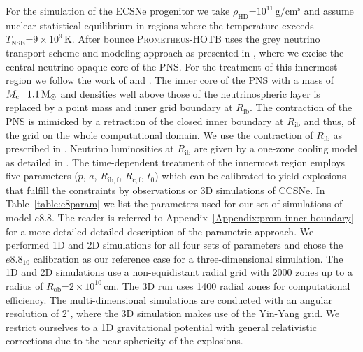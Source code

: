 \documentclass[fleqn,usenatbib]{mnras}
\newcommand{\solm}{\ensuremath{\rm{M_{\odot}}}\xspace}
\newcommand{\prom}{\textsc{Prometheus-HOTB}\xspace}
\newcommand{\GEO}[1]{{\color{red}#1}}
\begin{document}
For the simulation of the ECSNe progenitor we take $\rho_{\mathrm{HD}}\mathord{=}10^{11}\,\mathrm{g/cm^s}$ and assume nuclear statistical equilibrium in regions where the temperature exceeds $T_{\mathrm{NSE}}\mathord{=}9\times10^9\,\mathrm{K}$.
After bounce \prom uses the grey neutrino transport scheme and modeling approach as presented in \cite{Scheck2006}, where we excise the central neutrino-opaque core of the PNS. For the treatment of this innermost region we follow the work of \cite{Ugliano2012} and \cite{Sukhbold2016}. 
The inner core of the PNS with a mass of $M_{\mathrm{c}}\mathord{=}1.1\,\solm$ and densities well above those of the neutrinospheric layer is replaced by a point mass and inner grid boundary at $R_{\mathrm{ib}}$. The contraction of the PNS is mimicked by a retraction of the closed inner boundary at $R_{\mathrm{ib}}$ and thus, of the grid on the whole computational domain. We use the contraction of $R_{\mathrm{ib}}$ as prescribed in \cite{Ertl2016}.
Neutrino luminosities at $R_{\mathrm{ib}}$ are given by a one-zone cooling model as detailed in \cite{Ugliano2012}.
\GEO{The time-dependent treatment of the innermost region employs five parameters ($p$, $a$, $R_{\mathrm{ib,f}}$, $R_{\mathrm{c,f}}$, $t_{0}$) which can be calibrated to yield explosions that fulfill the constraints by observations or 3D simulations of CCSNe.
In Table~\ref{table:e8param} we list the parameters used for our set of simulations of model $e8.8$. The reader is referred to Appendix~\ref{Appendix:prom inner boundary} for a more detailed detailed description of the parametric approach.}
We performed 1D and 2D simulations for all four sets of parameters and chose the $e8.8_{10}$ calibration as our reference case for a three-dimensional simulation. The 1D and 2D simulations use a non-equidistant radial grid with 2000 zones up to a radius of $R_{\mathrm{ob}}\mathord{=}2\times 10^{10}\,\text{cm}$. 
The 3D run uses 1400 radial zones for computational efficiency. 
The multi-dimensional simulations are conducted with an angular resolution of $2^{\circ}$, where the 3D simulation makes use of the Yin-Yang grid.
We restrict ourselves to a 1D gravitational potential with general relativistic corrections due to the near-sphericity of the explosions.
\end{document}
